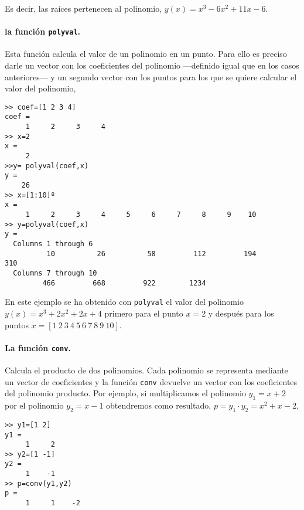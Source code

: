 Es decir, las raíces pertenecen al polinomio, $y(x)=x^3-6x^2+11x-6$.

\paragraph{la función \texttt{polyval}.} Esta función calcula el valor de un polinomio en un punto.  Para ello es preciso darle un vector con los coeficientes del polinomio ---definido igual que en los casos anteriores--- y un segundo vector con los puntos para los que se quiere calcular el valor del polinomio,

\begin{verbatim}
>> coef=[1 2 3 4]
coef =
     1     2     3     4
>> x=2
x =
     2
>>y= polyval(coef,x)
y =
    26
>> x=[1:10]º
x =
     1     2     3     4     5     6     7     8     9    10
>> y=polyval(coef,x)
y =
  Columns 1 through 6
          10          26          58         112         194         310
  Columns 7 through 10
         466         668         922        1234
\end{verbatim}  
 

En este ejemplo se ha obtenido con \texttt{polyval} el valor del polinomio $y(x)=x^3+2x^2+2x+4$ primero para el punto $x=2$ y después para los puntos $x=[1\ 2\ 3\ 4\ 5\ 6\ 7\ 8\ 9\ 10]$.

\paragraph{La función \texttt{conv}.} Calcula el producto de dos polinomios. Cada polinomio se representa mediante un vector de coeficientes y la función \texttt{conv} devuelve un vector con los coeficientes del polinomio producto. Por ejemplo, si multiplicamos   el polinomio $y_1=x+2$ por el polinomio $y_2=x-1$  obtendremos como resultado, $p=y_1\cdot y_2=x^2+x-2$,  

\begin{verbatim}
>> y1=[1 2]
y1 =
     1     2
>> y2=[1 -1]
y2 =
     1    -1
>> p=conv(y1,y2)
p =
     1     1    -2
\end{verbatim}

